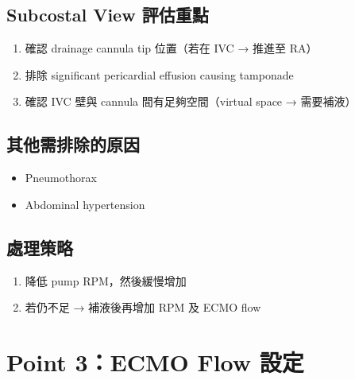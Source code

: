 \documentclass[12pt,a4paper]{article}
\begin{document}
\subsection{Subcostal View 評估重點}

\begin{enumerate}
    \item 確認 drainage cannula tip 位置（若在 IVC → 推進至 RA）
    \item 排除 significant pericardial effusion causing tamponade
    \item 確認 IVC 壁與 cannula 間有足夠空間（virtual space → 需要補液）
\end{enumerate}

\subsection{其他需排除的原因}

\begin{itemize}
    \item Pneumothorax
    \item Abdominal hypertension
\end{itemize}

\subsection{處理策略}

\begin{enumerate}
    \item 降低 pump RPM，然後緩慢增加
    \item 若仍不足 → 補液後再增加 RPM 及 ECMO flow
\end{enumerate}

\section{Point 3：ECMO Flow 設定}

\end{document}
